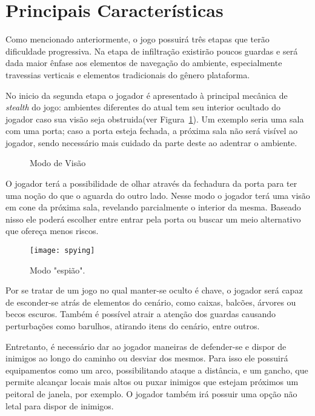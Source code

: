 \AddToShipoutPicture{\BackgroundPic}

\section*{Principais Características}

Como mencionado anteriormente, o jogo possuirá três etapas que terão dificuldade progressiva. Na etapa de infiltração existirão poucos guardas e será dada maior ênfase aos elementos de navegação do ambiente, especialmente travessias verticais e elementos tradicionais do gênero plataforma. 

	No inicio da segunda etapa o jogador é apresentado à principal mecânica de \emph{stealth} do jogo: ambientes diferentes do atual tem seu interior ocultado do jogador caso sua visão seja obstruida(ver Figura~\ref{visionmode}). Um exemplo seria uma sala com uma porta; caso a porta esteja fechada, a próxima sala não será visível ao jogador, sendo necessário mais cuidado da parte deste ao adentrar o ambiente. 
	
	\begin{figure}[h]
		\center
		\qquad
		\caption{Modo de Visão}
		\label{visionmode}
	\end{figure}
	
O jogador terá a possibilidade de olhar através da fechadura da porta para ter uma noção do que o aguarda do outro lado. Nesse modo o jogador terá uma visão em cone da próxima sala, revelando parcialmente o interior da mesma. Baseado nisso ele poderá escolher entre entrar pela porta ou buscar um meio alternativo que ofereça menos riscos.

	\begin{figure}[htb]
		\centering
		\texttt{[image: spying]}
		\caption{Modo "espião".}
	\end{figure}

Por se tratar de um jogo no qual manter-se oculto é chave, o jogador será capaz de esconder-se atrás de elementos do cenário, como caixas, balcões, árvores ou becos escuros. Também é possível atrair a atenção dos guardas causando perturbações como barulhos, atirando itens do cenário, entre outros. 

	Entretanto, é necessário dar ao jogador maneiras de defender-se e dispor de inimigos ao longo do caminho ou desviar dos mesmos. Para isso ele possuirá equipamentos como um arco, possibilitando ataque a distância, e um gancho, que permite alcançar locais mais altos ou puxar inimigos que estejam próximos um peitoral de janela, por exemplo. O jogador também irá possuir uma opção não letal para dispor de inimigos. 

